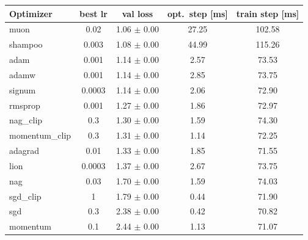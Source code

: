 \begin{tabular}{lcccc}
\toprule
Optimizer & best lr & val loss & opt.\ step [ms] & train step [ms] \\
\midrule
muon & 0.02 & 1.06 $\pm$ 0.00 & 27.25 & 102.58 \\
shampoo & 0.003 & 1.08 $\pm$ 0.00 & 44.99 & 115.26 \\
adam & 0.001 & 1.14 $\pm$ 0.00 & 2.57 & 73.53 \\
adamw & 0.001 & 1.14 $\pm$ 0.00 & 2.85 & 73.75 \\
signum & 0.0003 & 1.14 $\pm$ 0.00 & 2.06 & 72.90 \\
rmsprop & 0.001 & 1.27 $\pm$ 0.00 & 1.86 & 72.97 \\
nag_clip & 0.3 & 1.30 $\pm$ 0.00 & 1.59 & 74.30 \\
momentum_clip & 0.3 & 1.31 $\pm$ 0.00 & 1.14 & 72.25 \\
adagrad & 0.01 & 1.33 $\pm$ 0.00 & 1.85 & 71.55 \\
lion & 0.0003 & 1.37 $\pm$ 0.00 & 2.67 & 73.75 \\
nag & 0.03 & 1.70 $\pm$ 0.00 & 1.59 & 74.03 \\
sgd_clip & 1 & 1.79 $\pm$ 0.00 & 0.44 & 71.90 \\
sgd & 0.3 & 2.38 $\pm$ 0.00 & 0.42 & 70.82 \\
momentum & 0.1 & 2.44 $\pm$ 0.00 & 1.13 & 71.07 \\
\bottomrule
\end{tabular}
